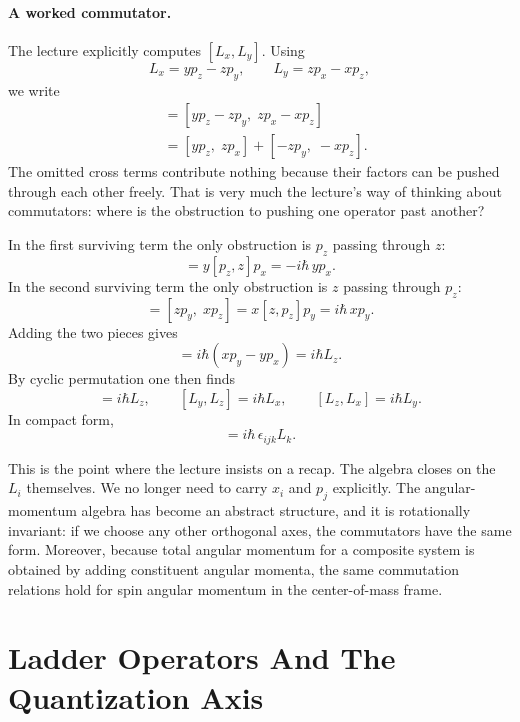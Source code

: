 \paragraph{A worked commutator.}

The lecture explicitly computes \([L_x,L_y]\). Using
\[
L_x=yp_z-zp_y,\qquad L_y=zp_x-xp_z,
\]
we write
\begin{align}
[L_x,L_y]
&=[yp_z-zp_y,\;zp_x-xp_z] \\
&=[yp_z,\;zp_x]+[-zp_y,\;-xp_z].
\end{align}
The omitted cross terms contribute nothing because their factors can be pushed through each other freely. That is very much the lecture's way of thinking about commutators: where is the obstruction to pushing one operator past another?

In the first surviving term the only obstruction is \(p_z\) passing through \(z\):
\begin{equation}
[yp_z,\;zp_x]=y[p_z,z]p_x=-i\hbar\,yp_x.
\end{equation}
In the second surviving term the only obstruction is \(z\) passing through \(p_z\):
\begin{equation}
[-zp_y,\;-xp_z]=[zp_y,\;xp_z]=x[z,p_z]p_y=i\hbar\,xp_y.
\end{equation}
Adding the two pieces gives
\begin{equation}
[L_x,L_y]=i\hbar(xp_y-yp_x)=i\hbar L_z.
\end{equation}
By cyclic permutation one then finds
\begin{equation}
[L_x,L_y]=i\hbar L_z,\qquad
[L_y,L_z]=i\hbar L_x,\qquad
[L_z,L_x]=i\hbar L_y.
\end{equation}
In compact form,
\begin{equation}
[L_i,L_j]=i\hbar\,\epsilon_{ijk}L_k.
\end{equation}

This is the point where the lecture insists on a recap. The algebra closes on the \(L_i\) themselves. We no longer need to carry \(x_i\) and \(p_j\) explicitly. The angular-momentum algebra has become an abstract structure, and it is rotationally invariant: if we choose any other orthogonal axes, the commutators have the same form. Moreover, because total angular momentum for a composite system is obtained by adding constituent angular momenta, the same commutation relations hold for spin angular momentum in the center-of-mass frame.

\section{Ladder Operators And The Quantization Axis}

